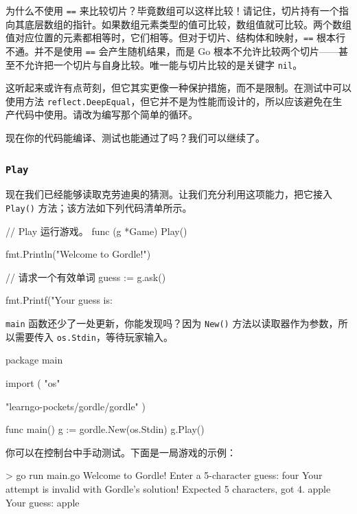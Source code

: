 为什么不使用 \texttt{==} 来比较切片？毕竟数组可以这样比较！请记住，切片持有一个指向其底层数组的指针。如果数组元素类型的值可比较，数组值就可比较。两个数组值对应位置的元素都相等时，它们相等。但对于切片、结构体和映射，\texttt{==} 根本行不通。并不是使用 \texttt{==} 会产生随机结果，而是 Go 根本不允许比较两个切片——甚至不允许把一个切片与自身比较。唯一能与切片比较的是关键字 \texttt{nil}。

这听起来或许有点苛刻，但它其实更像一种保护措施，而不是限制。在测试中可以使用方法 \texttt{reflect.DeepEqual}，但它并不是为性能而设计的，所以应该避免在生产代码中使用。请改为编写那个简单的循环。

现在你的代码能编译、测试也能通过了吗？我们可以继续了。

\subsubsection*{\texttt{Play}}

现在我们已经能够读取克劳迪奥的猜测。让我们充分利用这项能力，把它接入 \texttt{Play()} 方法；该方法如下列代码清单所示。

\begin{gocode}[title={代码清单 5.12 \texttt{game.go}：\texttt{Play} 方法}]
// Play 运行游戏。
func (g *Game) Play() {
    fmt.Println("Welcome to Gordle!")

    // 请求一个有效单词
    guess := g.ask()

    fmt.Printf("Your guess is: %
}
\end{gocode}

\texttt{main} 函数还少了一处更新，你能发现吗？因为 \texttt{New()} 方法以读取器作为参数，所以需要传入 \texttt{os.Stdin}，等待玩家输入。

\begin{gocode}[title={代码清单 5.13 \texttt{main.go}：用 \texttt{os.Stdin} 更新后的 \texttt{main} 函数}]
package main

import (
    "os"

    "learngo-pockets/gordle/gordle"
)

func main() {
    g := gordle.New(os.Stdin)
    g.Play()
}
\end{gocode}

你可以在控制台中手动测试。下面是一局游戏的示例：

\begin{shellcode}[]
> go run main.go
Welcome to Gordle!
Enter a 5-character guess:
four
Your attempt is invalid with Gordle's solution!
Expected 5 characters, got 4.
apple
Your guess: apple
\end{shellcode}


